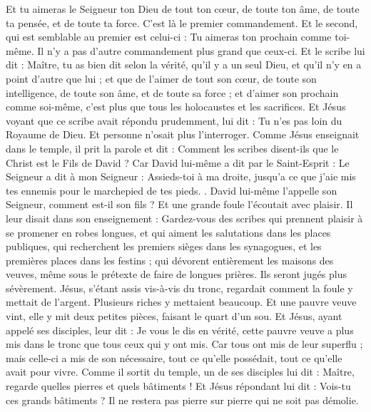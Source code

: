 \begin{multicols}{2}
Et tu aimeras le Seigneur ton Dieu de tout ton cœur, de toute ton âme, de toute ta pensée, et de toute ta force. C'est là le premier commandement.
Et le second, qui est semblable au premier est celui-ci : Tu aimeras ton prochain comme toi-même. Il n'y a pas d'autre commandement plus grand que ceux-ci.
Et le scribe lui dit : Maître, tu as bien dit selon la vérité, qu'il y a un seul Dieu, et qu'il n'y en a point d'autre que lui ;
et que de l'aimer de tout son cœur, de toute son intelligence, de toute son âme, et de toute sa force ; et d'aimer son prochain comme soi-même, c'est plus que tous les holocaustes et les sacrifices.
Et Jésus voyant que ce scribe avait répondu prudemment, lui dit : Tu n'es pas loin du Royaume de Dieu. Et personne n'osait plus l'interroger.
Comme Jésus enseignait dans le temple, il prit la parole et dit : Comment les scribes disent-ils que le Christ est le Fils de David ?
Car David lui-même a dit par le Saint-Esprit : Le Seigneur a dit à mon Seigneur : Assieds-toi à ma droite, jusqu'a ce que j'aie mis tes ennemis pour le marchepied de tes pieds.
.
David lui-même l'appelle son Seigneur, comment est-il son fils ? Et une grande foule l'écoutait avec plaisir.
Il leur disait dans son enseignement : Gardez-vous des scribes qui prennent plaisir à se promener en robes longues, et qui aiment les salutations dans les places publiques,
qui recherchent les premiers sièges dans les synagogues, et les premières places dans les festins ;
qui dévorent entièrement les maisons des veuves, même sous le prétexte de faire de longues prières. Ils seront jugés plus sévèrement.
Jésus, s'étant assis vis-à-vis du tronc, regardait comment la foule y mettait de l'argent. Plusieurs riches y mettaient beaucoup.
Et une pauvre veuve vint, elle y mit deux petites pièces, faisant le quart d'un sou.
Et Jésus, ayant appelé ses disciples, leur dit : Je vous le dis en vérité, cette pauvre veuve a plus mis dans le tronc que tous ceux qui y ont mis.
Car tous ont mis de leur superflu ; mais celle-ci a mis de son nécessaire, tout ce qu'elle possédait, tout ce qu'elle avait pour vivre.
\VerseOne{}Comme il sortit du temple, un de ses disciples lui dit : Maître, regarde quelles pierres et quels bâtiments !
Et Jésus répondant lui dit : Vois-tu ces grands bâtiments ? Il ne restera pas pierre sur pierre qui ne soit pas démolie.

\end{multicols}
